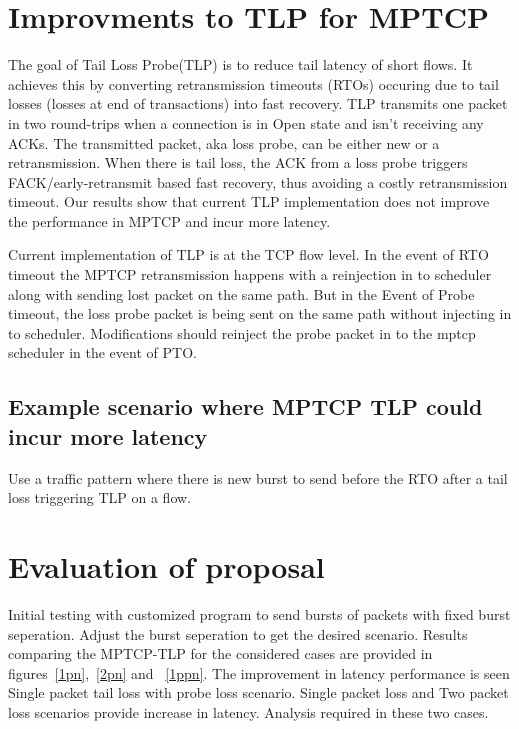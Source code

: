 \documentclass[10pt,draftcls,twocolumn]{IEEEconf}
\begin{document}
\section{Improvments to TLP for MPTCP}
The goal of Tail Loss Probe(TLP) is to reduce tail latency of short flows. It achieves this by converting retransmission timeouts (RTOs) occuring due to tail losses (losses at end of transactions) into fast recovery. TLP transmits one packet in two round-trips when a connection is in Open state and isn't receiving any ACKs. The transmitted packet, aka loss probe, can be either new or a retransmission. When there is tail loss, the ACK from a loss probe triggers FACK/early-retransmit based fast recovery, thus avoiding a costly retransmission timeout. Our results show that current TLP implementation does not improve the performance in MPTCP and incur more latency.

Current implementation of TLP is at the TCP flow level. In the event of RTO timeout the MPTCP retransmission happens with a reinjection in to scheduler along with sending lost packet on the same path. But in the Event of Probe timeout, the loss probe packet is being sent on the same path without injecting in to scheduler.  Modifications should reinject the probe packet in to the mptcp scheduler in the event of PTO.

\subsection{Example scenario where MPTCP TLP could incur more latency}

Use a traffic pattern where there is new burst to send before the RTO after a tail loss triggering TLP on a flow.


\section{Evaluation of proposal}

Initial testing with customized program to send bursts of packets with fixed burst seperation. Adjust the burst seperation to get the desired scenario.
Results comparing the MPTCP-TLP for the considered cases are provided in figures~\ref{1pn},~\ref{2pn} and ~\ref{1ppn}. The improvement in latency
performance is seen Single packet tail loss with probe loss scenario. Single packet loss and Two packet loss scenarios provide increase in latency.
Analysis required in these two cases.
\end{document}
